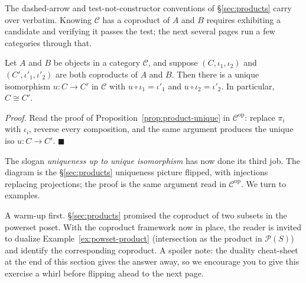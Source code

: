 \noindent The dashed-arrow and test-not-constructor conventions
of \S\ref{sec:products} carry over verbatim. Knowing
$\mathcal{C}$ has a coproduct of $A$ and $B$ requires exhibiting
a candidate and verifying it passes the test; the next several
pages run a few categories through that.

\begin{proposition}\label{prop:coproduct-unique}
Let $A$ and $B$ be objects in a category $\mathcal{C}$, and
suppose $(C, \iota_1, \iota_2)$ and $(C', \iota'_1, \iota'_2)$
are both coproducts of $A$ and $B$. Then there is a unique
isomorphism $u : C \to C'$ in $\mathcal{C}$ with
$u \circ \iota_1 = \iota'_1$ and $u \circ \iota_2 = \iota'_2$.
In particular, $C \cong C'$.

\begin{center}
\end{center}

\noindent \textit{Proof.} Read the proof of
Proposition~\ref{prop:product-unique} in
$\mathcal{C}^{\mathrm{op}}$: replace $\pi_i$ with $\iota_i$,
reverse every composition, and the same argument produces the
unique iso $u : C \to C'$. $\blacksquare$
\end{proposition}

\noindent The slogan \textit{uniqueness up to unique
isomorphism} has now done its third job. The diagram is the
\S\ref{sec:products} uniqueness picture flipped, with injections
replacing projections; the proof is the same argument read in
$\mathcal{C}^{\mathrm{op}}$. We turn to examples.
\newpage 

\noindent A warm-up first. \S\ref{sec:products} promised the
coproduct of two subsets in the powerset poset. With the
coproduct framework now in place, the reader is invited to
dualize Example~\ref{ex:powset-product} (intersection as the
product in $\mathcal{P}(S)$) and identify the corresponding
coproduct. A spoiler note: the duality cheat-sheet at the end
of this section gives the answer away, so we encourage you to 
give this exercise a whirl before flipping ahead to the next 
page.

